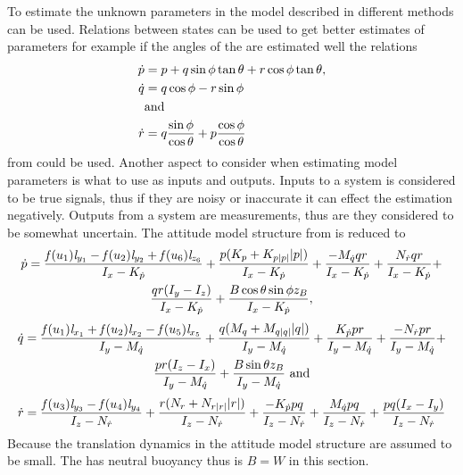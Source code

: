 To estimate the unknown parameters in the \abbrROV model described in  different methods can be used. Relations between states can be used to get better estimates of parameters for example if the angles of the \abbrROV are estimated well the relations
\begin{align}
\dot{p} &= p + q \sin \phi \tan \theta + r \cos \phi \tan \theta,\\
\dot{q} &= q \cos \phi - r \sin \phi \\
&\textrm{and} \nonumber \\
\dot{r} &= q \frac{\sin \phi}{\cos \theta} + p \frac{\cos \phi}{\cos \theta}
\end{align}
from  could be used. Another aspect to consider when estimating model parameters is what to use as inputs and outputs. Inputs to a system is considered to be true signals, thus if they are noisy or inaccurate it can effect the estimation negatively. Outputs from a system are measurements, thus are they considered to be somewhat uncertain. The attitude model structure from  is reduced to 
\begin{multline} \label{eq:p_dotWithoutTranslation}
\dot{p} = \frac{\mathit{f}(u_{1}) \mathit{l}_{y_{1}} - \mathit{f}(u_{2}) \mathit{l}_{y_{2}} + \mathit{f}(u_{6}) \mathit{l}_{z_{6}}}{I_{x} - K_{\dot{p}}} + \frac{p (K_{p} + K_{p|p|} |p|)}{I_{x} - K_{\dot{p}}} + \frac{-M_{\dot{q}} q r}{I_{x} - K_{\dot{p}}} + \frac{N_{\dot{r}} q r}{I_{x} - K_{\dot{p}}} +\\
\frac{q r (I_{y} - I_{z})}{I_{x} - K_{\dot{p}}} + \frac{B \cos{\theta} \sin{\phi} z_B}{I_{x} - K_{\dot{p}}},
\end{multline} 
\begin{multline} \label{eq:q_dotWithoutTranslation}
\dot{q} =\frac{\mathit{f}(u_{1}) \mathit{l}_{x_{1}} + \mathit{f}(u_{2}) \mathit{l}_{x_{2}} - \mathit{f}(u_{5}) \mathit{l}_{x_{5}}}{I_{y} - M_{\dot{q}}} + \frac{q (M_{q} + M_{q|q|} |q|)}{I_{y} - M_{\dot{q}}} + \frac{K_{\dot{p}} p r}{I_{y} - M_{\dot{q}}} + \frac{-N_{\dot{r}} p r}{I_{y} - M_{\dot{q}}} +\\
\frac{p r (I_{z} - I_{x})}{I_{y} - M_{\dot{q}}} + \frac{B \sin{\theta} z_B}{I_{y} - M_{\dot{q}}}\ \textrm{and}
\end{multline} 
\begin{multline} \label{eq:r_dotWithoutTranslation}
\dot{r} = \frac{\mathit{f}(u_{3}) \mathit{l}_{y_{3}} - \mathit{f}(u_{4}) \mathit{l}_{y_{4}}}{I_{z} - N_{\dot{r}}} + \frac{r (N_{r} + N_{r|r|} |r|)}{I_{z} - N_{\dot{r}}} + \frac{-K_{\dot{p}} p q}{I_{z} - N_{\dot{r}}} + \frac{M_{\dot{q}} p q}{I_{z} - N_{\dot{r}}} + \frac{p q (I_{x} - I_{y})}{I_{z} - N_{\dot{r}}}
\end{multline} 
Because the translation dynamics in the attitude model structure are assumed to be small. The \abbrROV has neutral buoyancy thus is $B = W$ in this section.

